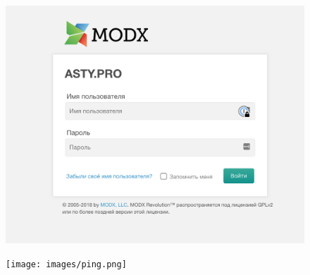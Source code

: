 \begin{figure}[ht]
	\centering
	\label{modx}
	\includegraphics[width=\textwidth]{images/4.png}
	\caption{}
\end{figure}


\begin{figure}[ht]
	\centering
	\label{ping}
	\texttt{[image: images/ping.png]}
	\caption{}
\end{figure}

